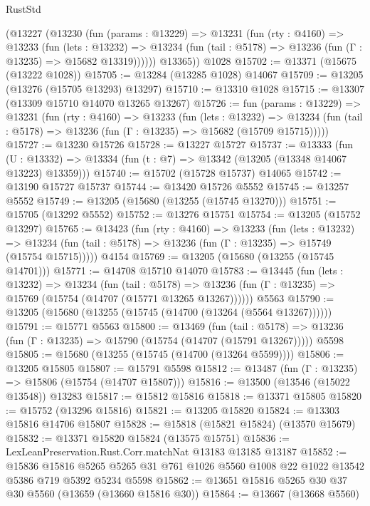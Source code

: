 \begin{lexlean}{RustStd}
\begin{coremodule}
      (@13227
        (@13230
          (fun (params : @13229) =>
          @13231
            (fun (rty : @4160) =>
            @13233
              (fun (lets : @13232) =>
              @13234 (fun (tail : @5178) => @13236 (fun (Γ : @13235) => @15682 @13319))))))
        @13365))
    @1028
@15702 := @13371 (@15675 (@13222 @1028))
@15705 := @13284 (@13285 @1028) @14067
@15709 := @13205 (@13276 (@15705 @13293) @13297)
@15710 := @13310 @1028
@15715 := @13307 (@13309 @15710 @14070 @13265 @13267)
@15726 := fun (params : @13229) =>
  @13231
    (fun (rty : @4160) =>
    @13233
      (fun (lets : @13232) =>
      @13234 (fun (tail : @5178) => @13236 (fun (Γ : @13235) => @15682 (@15709 @15715)))))
@15727 := @13230 @15726
@15728 := @13227 @15727
@15737 := @13333
    (fun (U : @13332) => @13334 (fun (t : @7) => @13342 (@13205 (@13348 @14067 @13223) @13359)))
@15740 := @15702 (@15728 @15737) @14065
@15742 := @13190 @15727 @15737
@15744 := @13420 @15726 @5552
@15745 := @13257 @5552
@15749 := @13205 (@15680 (@13255 (@15745 @13270)))
@15751 := @15705 (@13292 @5552)
@15752 := @13276 @15751
@15754 := @13205 (@15752 @13297)
@15765 := @13423
    (fun (rty : @4160) =>
    @13233
      (fun (lets : @13232) =>
      @13234 (fun (tail : @5178) => @13236 (fun (Γ : @13235) => @15749 (@15754 @15715)))))
    @4154
@15769 := @13205 (@15680 (@13255 (@15745 @14701)))
@15771 := @14708 @15710 @14070
@15783 := @13445
    (fun (lets : @13232) =>
    @13234
      (fun (tail : @5178) =>
      @13236 (fun (Γ : @13235) => @15769 (@15754 (@14707 (@15771 @13265 @13267))))))
    @5563
@15790 := @13205 (@15680 (@13255 (@15745 (@14700 (@13264 (@5564 @13267))))))
@15791 := @15771 @5563
@15800 := @13469
    (fun (tail : @5178) => @13236 (fun (Γ : @13235) => @15790 (@15754 (@14707 (@15791 @13267)))))
    @5598
@15805 := @15680 (@13255 (@15745 (@14700 (@13264 @5599))))
@15806 := @13205 @15805
@15807 := @15791 @5598
@15812 := @13487 (fun (Γ : @13235) => @15806 (@15754 (@14707 @15807)))
@15816 := @13500 (@13546 (@15022 @13548)) @13283
@15817 := @15812 @15816
@15818 := @13371 @15805
@15820 := @15752 (@13296 @15816)
@15821 := @13205 @15820
@15824 := @13303 @15816 @14706 @15807
@15828 := @15818 (@15821 @15824) (@13570 @15679)
@15832 := @13371 @15820 @15824 (@13575 @15751)
@15836 := LexLeanPreservation.Rust.Corr.matchNat @13183 @13185 @13187
@15852 := @15836
    @15816
    @5265
    @5265
    @31
    @761
    @1026
    @5560
    @1008
    @22
    @1022
    @13542
    @5386
    @719
    @5392
    @5234
    @5598
@15862 := @13651 @15816 @5265 @30 @37 @30 @5560 (@13659 (@13660 @15816 @30))
@15864 := @13667 (@13668 @5560)

\end{coremodule}
\end{lexlean}
